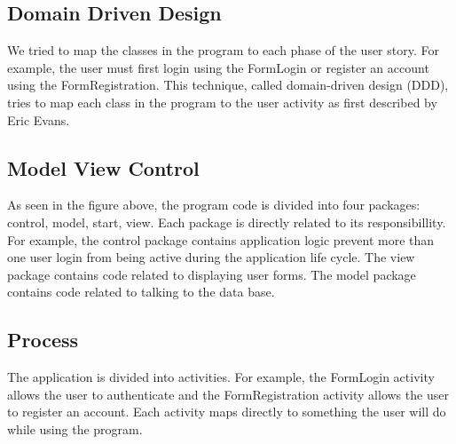 \documentclass[a4paper,10pt,toc=graduated]{article}
\begin{document}
\subsection{Domain Driven Design}
We tried to map the classes in the program to each phase of the user story.
For example, the user must first login using the FormLogin
or register an account using the FormRegistration.
This technique, called domain-driven design (DDD),
tries to map each class in the program to the user activity
as first described by Eric Evans.
\newline

\subsection{Model View Control}

As seen in the figure above,
the program code is divided into four packages: control, model, start, view.
Each package is directly related to its responsibillity.
For example,
the control package contains application logic prevent more than one user login
from being active during the application life cycle.
The view package contains code related to displaying user forms.
The model package contains code related to talking to the data base.

\subsection{Process}
The application is divided into activities.
For example, the FormLogin activity allows the user to authenticate
and the FormRegistration activity allows the user to register an account.
Each activity maps directly to something the user will do while using the program.
\newline
\end{document}
